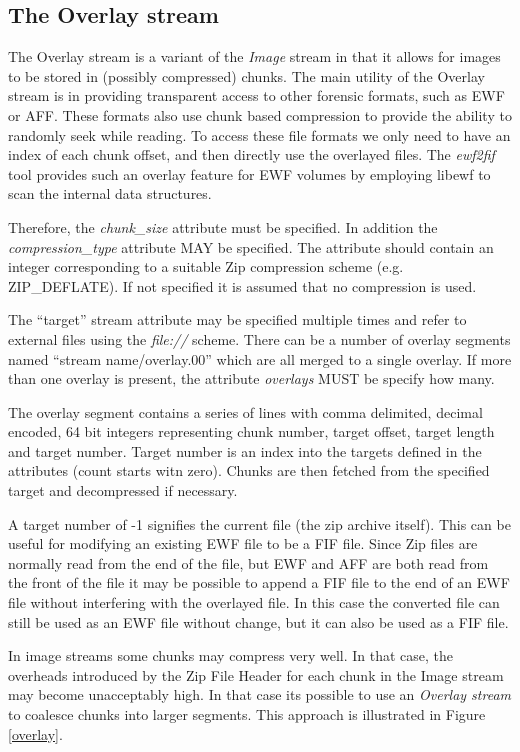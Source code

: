 \documentclass[10pt, conference]{IEEEtran}
\begin{document}
\subsection{The Overlay stream}
The Overlay stream is a variant of the {\em Image} stream in that it
allows for images to be stored in (possibly compressed) chunks. The
main utility of the Overlay stream is in providing transparent access
to other forensic formats, such as EWF or AFF. These formats also use
chunk based compression to provide the ability to randomly seek while
reading. To access these file formats we only need to have an index of
each chunk offset, and then directly use the overlayed files. The {\em
ewf2fif} tool provides such an overlay feature for EWF volumes by
employing libewf to scan the internal data structures.

Therefore, the {\em chunk\_size} attribute must be specified. In
addition the {\em compression\_type} attribute MAY be specified. The
attribute should contain an integer corresponding to a suitable Zip
compression scheme (e.g. ZIP\_DEFLATE). If not specified it is assumed
that no compression is used.

The ``target'' stream attribute may be specified multiple times and
refer to external files using the {\em file://} scheme. There can be a
number of overlay segments named ``stream name/overlay.00'' which are
all merged to a single overlay. If more than one overlay is present,
the attribute {\em overlays} MUST be specify how many.

The overlay segment contains a series of lines with comma delimited,
decimal encoded, 64 bit integers representing chunk number, target
offset, target length and target number. Target number is an index
into the targets defined in the attributes (count starts witn zero).
Chunks are then fetched from the specified target and decompressed if
necessary.

A target number of -1 signifies the current file (the zip archive
itself). This can be useful for modifying an existing EWF file to be a
FIF file. Since Zip files are normally read from the end of the file,
but EWF and AFF are both read from the front of the file it may be
possible to append a FIF file to the end of an EWF file without
interfering with the overlayed file. In this case the converted file
can still be used as an EWF file without change, but it can also be
used as a FIF file.

In image streams some chunks may compress very well. In that case, the
overheads introduced by the Zip File Header for each chunk in the
Image stream may become unacceptably high. In that case its possible
to use an {\em Overlay stream} to coalesce chunks into larger
segments. This approach is illustrated in Figure \ref{overlay}.
\end{document}
